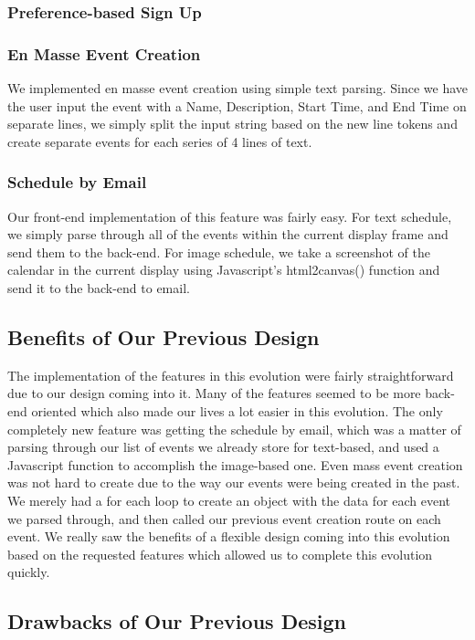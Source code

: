 \documentclass[11pt]{article}   %
\begin{document}
\subsubsection{Preference-based Sign Up}


\subsubsection{En Masse Event Creation}

We implemented en masse event creation using simple text parsing. Since we have the user input the event with a Name, Description, Start Time, and End Time on separate lines, we simply split the input string based on the new line tokens and create separate events for each series of 4 lines of text.

\subsubsection{Schedule by Email}
Our front-end implementation of this feature was fairly easy. For text schedule, we simply parse through all of the events within the current display frame and send them to the back-end. For image schedule, we take a screenshot of the calendar in the current display using Javascript's html2canvas() function and send it to the back-end to email.

\subsection{Benefits of Our Previous Design}

The implementation of the features in this evolution were fairly straightforward due to our design coming into it. Many of the features seemed to be more back-end oriented which also made our lives a lot easier in this evolution. The only completely new feature was getting the schedule by email, which was a matter of parsing through our list of events we already store for text-based, and used a Javascript function to accomplish the image-based one. Even mass event creation was not hard to create due to the way our events were being created in the past. We merely had a for each loop to create an object with the data for each event we parsed through, and then called our previous event creation route on each event. We really saw the benefits of a flexible design coming into this evolution based on the requested features which allowed us to complete this evolution quickly.

\subsection{Drawbacks of Our Previous Design}
\end{document}
